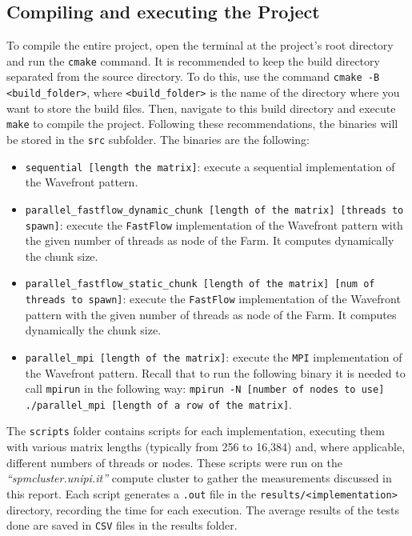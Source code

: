 \subsection*{Compiling and executing the Project}
To compile the entire project, open the terminal at the project's root directory and run the \texttt{cmake} command. It is recommended to keep the build directory separated from the source directory. To do this, use the command \texttt{cmake -B <build\_folder>}, where \texttt{<build\_folder>} is the name of the directory where you want to store the build files. Then, navigate to this build directory and execute \texttt{make} to compile the project. Following these recommendations, the binaries will be stored in the \texttt{src} subfolder. The binaries are the following:
\begin{itemize}
    \item \texttt{sequential [length the matrix]}: execute a sequential implementation of the Wavefront pattern.
    \item \texttt{parallel\_fastflow\_dynamic\_chunk [length of the matrix] [threads to spawn]}: execute the \texttt{FastFlow} implementation of the Wavefront pattern with the given number of threads as node of the Farm. It computes dynamically the chunk size.
    \item \texttt{parallel\_fastflow\_static\_chunk [length of the matrix] [num of threads to spawn]}: execute the \texttt{FastFlow} implementation of the Wavefront pattern with the given number of threads as node of the Farm. It computes dynamically the chunk size.
    \item \texttt{parallel\_mpi [length of the matrix]}: execute the \texttt{MPI} implementation of the Wavefront pattern. Recall that to run the following binary it is needed to call \texttt{mpirun} in the following way: \texttt{mpirun -N [number of nodes to use] ./parallel\_mpi [length of a row of the matrix]}.
\end{itemize}

The \texttt{scripts} folder contains scripts for each implementation, executing them with various matrix lengths (typically from 256 to 16,384) and, where applicable, different numbers of threads or nodes. These scripts were run on the \textit{``spmcluster.unipi.it''} compute cluster to gather the measurements discussed in this report. Each script generates a \texttt{.out} file in the \texttt{results/<implementation>} directory, recording the time for each execution. The average results of the tests done are saved in \texttt{CSV} files in the results folder. 

